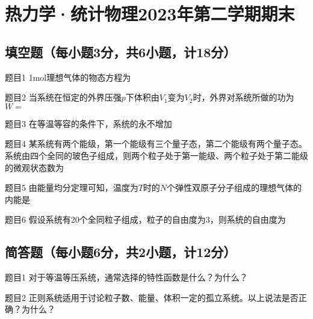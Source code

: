 \section{热力学·统计物理2023年第二学期期末}

\subsection{填空题（每小题3分，共6小题，计18分）}
\begin{question}{题目1}
    1mol理想气体的物态方程为\underline{\qquad}\underline{\qquad}
\end{question}

\begin{question}{题目2}
    当系统在恒定的外界压强$p$下体积由$V_1$变为$V_2$时，外界对系统所做的功为$W=$\underline{\qquad}\underline{\qquad}
\end{question}

\begin{question}{题目3}
    在等温等容的条件下，系统的\underline{\qquad}\underline{\qquad}永不增加
\end{question}

\begin{question}{题目4}
    某系统有两个能级，第一个能级有三个量子态，第二个能级有两个量子态。系统由四个全同的玻色子组成，则两个粒子处于第一能级、两个粒子处于第二能级的微观状态数为\underline{\qquad}\underline{\qquad}
\end{question}

\begin{question}{题目5}
    由能量均分定理可知，温度为$T$时的$N$个弹性双原子分子组成的理想气体的内能是\underline{\qquad}\underline{\qquad}
\end{question}

\begin{question}{题目6}
    假设系统有20个全同粒子组成，粒子的自由度为3，则系统的自由度为\underline{\qquad}\underline{\qquad}
\end{question}


\subsection{简答题（每小题6分，共2小题，计12分）}
\begin{question}{题目1}
    对于等温等压系统，通常选择的特性函数是什么？为什么？
\end{question}

\begin{question}{题目2}
    正则系统适用于讨论粒子数、能量、体积一定的孤立系统。以上说法是否正确？为什么？
\end{question}

